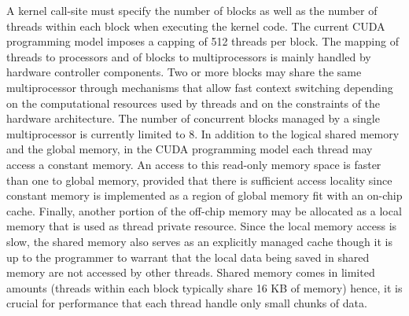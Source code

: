    A kernel call-site must specify the number of blocks as well as the number of threads within each
block when executing the kernel code. The current CUDA programming model imposes a capping of 512 threads per block.\newline
   The mapping of threads to processors and of blocks to multiprocessors is mainly handled by hardware controller components.
Two or more blocks may share the same multiprocessor through mechanisms that allow fast context switching depending on 
the computational resources used by threads and on the constraints of the hardware architecture.
The number of concurrent blocks managed by a single multiprocessor is currently limited to 8.\newline
   In addition to the logical shared memory and the global memory, in the CUDA programming model each thread may access a constant memory.
 An access to this read-only memory space is faster than one to global memory, provided that there is sufficient access locality since
constant memory is implemented as a region of global memory fit with an on-chip cache.
Finally, another portion of the off-chip memory may be allocated as a local memory that is used as thread private resource.
Since the local memory access is slow, the shared memory also serves as an explicitly managed cache though it is up to the
programmer to warrant that the local data being saved in shared memory are not accessed by other
threads. Shared memory comes in limited amounts (threads within each block typically share 16 KB of memory) hence,
it is crucial for performance that each thread handle only small chunks of data.

